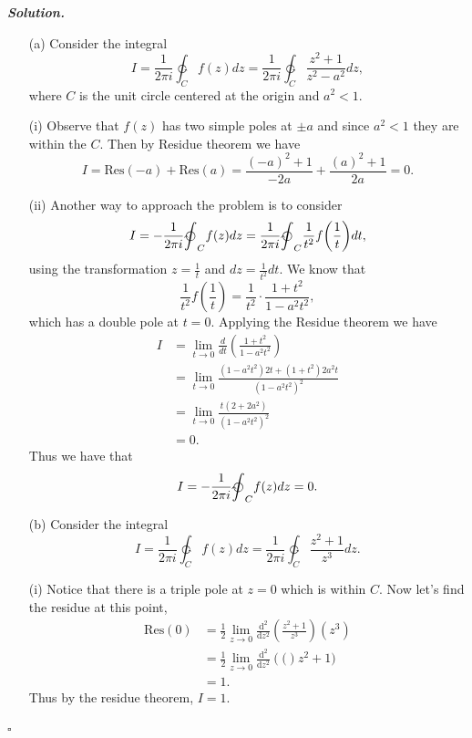 \documentclass[12pt]{report}
\newenvironment{solution}[1][\it{Solution}]{\textbf{#1. } }{$\square$}
\newcommand{\paren}[1]{{\left(#1\right)}} %
\newcommand{\ddn}[3]{\frac{\mathrm{d}^{#1} #2}{\mathrm{d} #3^{#1}}} %
\def\ointcc{{\ointctrclockwise}} %
\def\ointc{{\ointclockwise}} %
\begin{document}
\begin{solution}
    \noindent
    \begin{enumerate}
        \item [(a)]
        Consider the integral
        \[
            I = \frac{1}{2\pi i} \ointcc_C f(z) dz= \frac{1}{2\pi i} \ointcc_C \frac{z^2 + 1}{z^2 - a^2} dz,
        \]
        where $C$ is the unit circle centered at the origin and $a^2 < 1$. 
        
        \noindent
        (i) Observe that $f(z)$ has two simple poles at $\pm a$ and since $a^2 < 1$ they are within the $C$. Then by Residue theorem we have
        \[ 
            I = \text{Res}(-a) + \text{Res}(a) = \frac{(-a)^2 + 1}{-2a} + \frac{(a)^2 + 1}{2a} = 0.
        \]
        
        \noindent
        (ii) Another way to approach the problem is to consider
        \[ I = - \frac{1}{2\pi i} \ointc_C f(z) dz  =  \frac{1}{2\pi i} \ointc_C \frac{1}{t^2}f\paren{\frac{1}{t}}dt,\]
        using the transformation $z = \frac{1}{t}$ and $dz = \frac{1}{t^2}dt$. 
        We know that
        \[ \frac{1}{t^2}f\paren{\frac{1}{t}}  = \frac{1}{t^2} \cdot \frac{1 + t^2}{1 - a^2t^2},\]
        which has a double pole at $t = 0$. Applying the Residue theorem we have
        \begin{align*}
            I &= \lim_{t \to 0} \frac{d}{dt} \paren{\frac{1 + t^2}{1 - a^2t^2}}\\
            &= \lim_{t \to 0} \frac{(1 - a^2t^2)2t + (1 + t^2)2a^2t}{(1 - a^2t^2)^2}\\
            &= \lim_{t \to 0} \frac{t(2 + 2a^2)}{(1 - a^2t^2)^2}\\
            &= 0.
        \end{align*} 
        Thus we have that 
        \[ I = - \frac{1}{2\pi i} \ointc_C f(z) dz = 0.\]
        \item [(b)]
        Consider the integral
        \[ I = \frac{1}{2\pi i} \ointcc_C f(z) dz = \frac{1}{2\pi i} \ointcc_C \frac{z^2 + 1}{z^3} dz.\]
        
        \noindent
        (i)
        Notice that there is a triple pole at $z = 0$ which is within $C$. Now let's find the residue at this point,
        \begin{align*}
            \text{Res}(0) &= \frac{1}{2} \lim_{z \to 0} \ddn{2}{}{z}\paren{\frac{z^2+1}{z^3}}\paren{z^3}\\
            &= \frac{1}{2}\lim_{z \to 0} \ddn{2}{}{z} \paren(z^2 + 1)\\
            &= 1.
        \end{align*}
        Thus by the residue theorem,
        $I = 1$.


\end{enumerate}
\end{solution}
\end{document}
